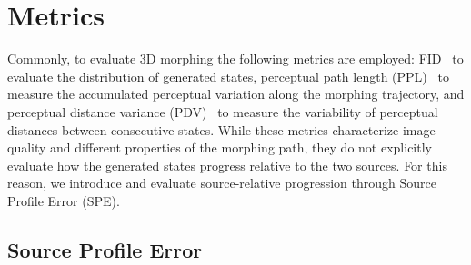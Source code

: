 
\section{Metrics}
\label{sec:metrics}


Commonly, to evaluate 3D morphing the following metrics are employed: FID~\cite{heusel2017fid} to evaluate the distribution of generated states, perceptual path length (PPL)~\cite{karras2019stylegan} to measure the accumulated perceptual variation along the morphing trajectory, and perceptual distance variance (PDV)~\cite{zhang2024diffmorpher} to measure the variability of perceptual distances between consecutive states. While these metrics characterize image quality and different properties of the morphing path, they do not explicitly evaluate how the generated states progress relative to the two sources. For this reason, we introduce and evaluate source-relative progression through Source Profile Error (SPE).

\subsection{Source Profile Error}
\label{sec:spe}



